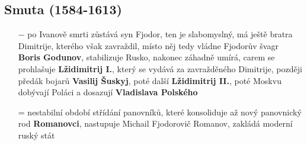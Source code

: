 \documentclass{article}
\begin{document}
  \subsection*{Smuta (1584-1613)}
  \begin{itemize}
      \vspace{-0.5em}
      \setlength\itemsep{0.15em}
      \item[$-$] po Ivanově smrti zůstává syn Fjodor, ten je slabomyslný, má ještě bratra Dimitrije, kterého však zavraždil, místo něj tedy vládne Fjodorův švagr \textbf{Boris Godunov}, stabilizuje Rusko, nakonec záhadně umírá, carem se prohlašuje \textbf{Lžidimitrij I.}, který se vydává za zavražděného Dimitrije, později předák bojarů \textbf{Vasilij Šuskyj}, poté další \textbf{Lžidimitrij II.}, poté Moskvu dobývají Poláci a dosazují \textbf{Vladislava Polského}
      \item[=] nestabilní období střídání panovníků, které konsoliduje až nový panovnický rod \textbf{Romanovci}, nastupuje Michail Fjodorovič Romanov, zakládá moderní ruský stát
  \end{itemize}
\end{document}
